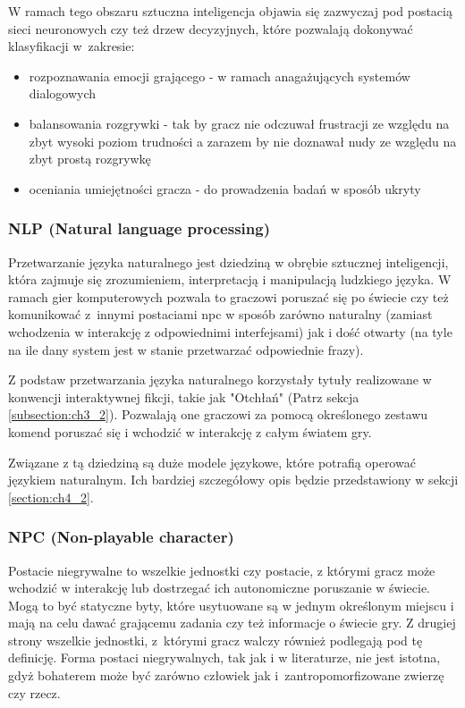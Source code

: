 W ramach tego obszaru sztuczna inteligencja objawia się zazwyczaj pod postacią sieci neuronowych czy
też drzew decyzyjnych, które pozwalają dokonywać klasyfikacji w~zakresie\cite{reusable_game_ai}:

\begin{itemize}
    \item rozpoznawania emocji grającego - w ramach anagażujących systemów dialogowych
    \item balansowania rozgrywki - tak by gracz nie odczuwał frustracji ze względu na zbyt wysoki poziom
          trudności a zarazem by nie doznawał nudy ze względu na zbyt prostą rozgrywkę
    \item oceniania umiejętności gracza - do prowadzenia badań w sposób ukryty
\end{itemize}

\subsubsection*{NLP (Natural language processing)}

Przetwarzanie języka naturalnego jest dziedziną w obrębie sztucznej inteligencji, która zajmuje się
zrozumieniem, interpretacją i manipulacją ludzkiego języka\cite{reusable_game_ai}. W ramach gier
komputerowych pozwala to graczowi poruszać się po świecie czy też komunikować z~innymi postaciami \gls{npc}
w sposób zarówno naturalny (zamiast wchodzenia w interakcję z odpowiednimi interfejsami) jak i dość
otwarty (na tyle na ile dany system jest w stanie przetwarzać odpowiednie frazy).

Z podstaw przetwarzania języka naturalnego korzystały tytuły realizowane w konwencji interaktywnej
fikcji, takie jak "Otchłań" (Patrz sekcja \ref{subsection:ch3_2}). Pozwalają one graczowi za pomocą
określonego zestawu komend poruszać się i wchodzić w interakcję z całym światem gry.

Związane z tą dziedziną są duże modele językowe, które potrafią operować językiem naturalnym.
Ich bardziej szczegółowy opis będzie przedstawiony w sekcji \ref{section:ch4_2}.

\subsubsection*{NPC (Non-playable character)}

Postacie niegrywalne to wszelkie jednostki czy postacie, z którymi gracz może wchodzić w
interakcję lub dostrzegać ich autonomiczne poruszanie w świecie. Mogą to być statyczne byty,
które usytuowane są w jednym określonym miejscu i mają na celu dawać grającemu zadania czy też
informacje o świecie gry. Z drugiej strony wszelkie jednostki, z~którymi gracz walczy również
podlegają pod tę definicję. Forma postaci niegrywalnych, tak jak i w literaturze, nie jest
istotna, gdyż bohaterem może być zarówno człowiek jak i~zantropomorfizowane zwierzę czy rzecz.

